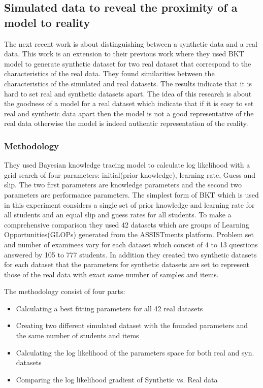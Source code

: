 \subsection{Simulated data to reveal the proximity of a model to reality}

The next recent work \citep{Rosenberg2015} is about distinguishing between a synthetic data and a real data. This work is an extension to their previous work \citep{Rosenberg2014} where they used BKT model to generate synthetic dataset for two real dataset that correspond to the characteristics of the real data. They found similarities between the characteristics of the simulated and real datasets. The results indicate that it is hard to set real and synthetic datasets apart. The idea of this research \citep{Rosenberg2015} is about the goodness of a model for a real dataset which indicate that if it is easy to set real and synthetic data apart then the model is not a good representative of the real data otherwise the model is indeed authentic representation of the reality.

\subsubsection{Methodology}
They used Bayesian knowledge tracing model to calculate log likelihood with a grid search of four parameters: initial(prior knowledge), learning rate, Guess and slip. The two first parameters are knowledge parameters and the second two parameters are performance parameters. The simplest form of BKT which is used in this experiment considers a single set of prior knowledge and  learning rate for all students and an equal slip and guess rates for all students.
To make a comprehensive comparison they used 42 datasets which are groups of Learning Opportunities(GLOPs) generated from the ASSISTments platform. Problem set and number of examinees vary for each dataset which consist of 4 to 13 questions answered by 105 to 777 students. In addition they created two synthetic datasets for each dataset that the parameters for synthetic datasets are set to represent those of the real data with exact same number of samples and items. 

The methodology consist of four parts:
\begin{itemize}
\item Calculating a best fitting parameters for all 42 real datasets
\item Creating two different simulated dataset with the founded parameters and the same number of students and items
\item Calculating the log likelihood of the parameters space for both real and syn. datasets
\item Comparing the log likelihood gradient of Synthetic vs. Real data
\end{itemize}

